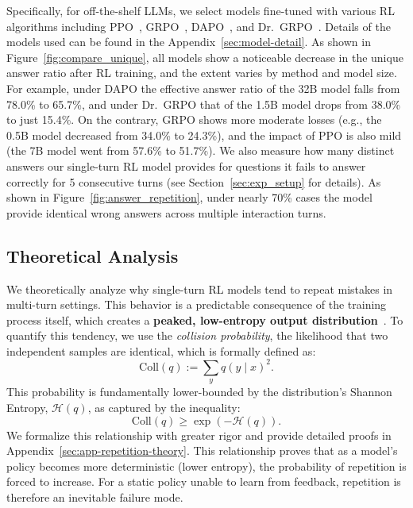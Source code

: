 Specifically, for off-the-shelf LLMs, we select models fine-tuned with various RL algorithms including PPO~\citep{ppo}, GRPO~\citep{deepseekmath}, DAPO~\citep{yu2025dapoopensourcellmreinforcement}, and Dr.\ GRPO~\citep{liu2025understanding}. Details of the models used can be found in the Appendix~\ref{sec:model-detail}. As shown in Figure~\ref{fig:compare_unique}, all models show a noticeable decrease in the unique answer ratio after RL training, and the extent varies by method and model size.
For example, under DAPO the effective answer ratio of the 32B model falls from 78.0\% to 65.7\%, and under Dr.\ GRPO that of the 1.5B model drops from 38.0\% to just 15.4\%. On the contrary, GRPO shows more moderate losses (e.g., the 0.5B model decreased from 34.0\% to 24.3\%), and the impact of PPO is also mild (the 7B model went from 57.6\% to 51.7\%). 
We also measure how many distinct answers our single-turn RL model provides for questions it fails to answer correctly for 5 consecutive turns (see Section~\ref{sec:exp_setup} for details). As shown in Figure~\ref{fig:answer_repetition}, under nearly 70\% cases the model provide identical wrong answers across multiple interaction turns.

\subsection{Theoretical Analysis}
\label{sec:theoretical_sketch}

We theoretically analyze why single-turn RL models tend to repeat mistakes in multi-turn settings. This behavior is a predictable consequence of the training process itself, which creates a \textbf{peaked, low-entropy output distribution}~\citep{cui2025entropymechanismreinforcementlearning, yue2025doesreinforcementlearningreally}. To quantify this tendency, we use the \emph{collision probability}, the likelihood that two independent samples are identical, which is formally defined as:
\begin{equation}
    \mathrm{Coll}(q) := \sum_y q(y \mid x)^2.
\end{equation}
This probability is fundamentally lower-bounded by the distribution's Shannon Entropy, $\mathcal{H}(q)$, as captured by the inequality:
\begin{equation}
    \mathrm{Coll}(q) \ge \exp(-\mathcal{H}(q)).
\end{equation}
We formalize this relationship with greater rigor and provide detailed proofs in Appendix~\ref{sec:app-repetition-theory}. This relationship proves that as a model's policy becomes more deterministic (lower entropy), the probability of repetition is forced to increase. For a static policy unable to learn from feedback, repetition is therefore an inevitable failure mode.

